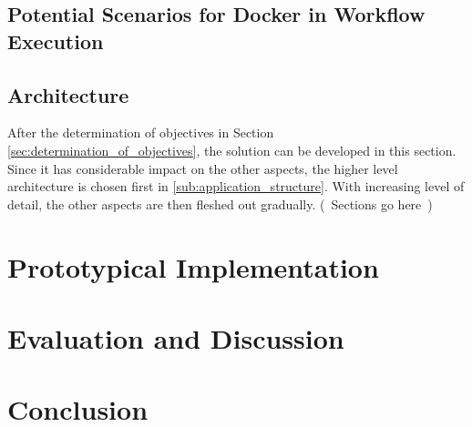 \documentclass[language=english,noinputenc]{wiwwuwordrprt}
\begin{document}
      

    \section{Potential Scenarios for Docker in Workflow Execution} %
      \label{sec:docker_for_wf_execution}
      

    \section{Architecture} %
      \label{sec:architecture}

      After the determination of objectives in Section \ref{sec:determination_of_objectives}, the solution can be developed in this section. Since it has considerable impact on the other aspects, the higher level architecture is chosen first in \ref{sub:application_structure}. With increasing level of detail, the other aspects are then fleshed out gradually. (~Sections go here~)

      


  \chapter{Prototypical Implementation} %
    \label{cha:implementation}

    

  \chapter{Evaluation and Discussion} %
    \label{cha:evaluation}
    

  \chapter{Conclusion} %
    \label{cha:conclusion}
    

  
  
\end{document}
